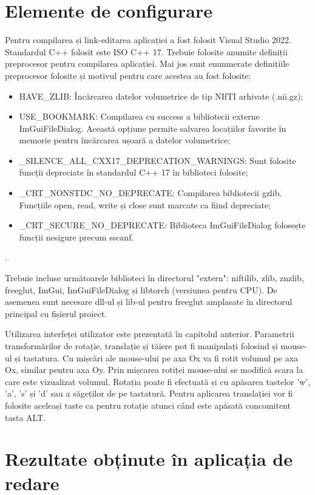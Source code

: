 
\section{Elemente de configurare}

Pentru compilarea și link-editarea aplicației a fost folosit Visual Studio 2022. Standardul C++ folosit este ISO C++ 17. Trebuie folosite anumite definiții preprocesor pentru compilarea aplicației. Mai jos sunt enunmerate definițiile preprocesor folosite și motivul pentru care acestea au fost folosite:

\begin{itemize}
\item HAVE\_ZLIB: Încărcarea datelor volumetrice de tip NIfTI arhivate (.nii.gz);
\item USE\_BOOKMARK: Compilarea cu success a bibliotecii externe ImGuiFileDialog. Această opțiune permite salvarea locațiilor favorite în memorie pentru încărcarea ușoară a datelor volumetrice;
\item \_SILENCE\_ALL\_CXX17\_DEPRECATION\_WARNINGS: Sunt folosite funcții depreciate în standardul C++ 17 în biblioteci folosite;
\item \_CRT\_NONSTDC\_NO\_DEPRECATE: Compilarea bibliotecii gzlib. Funcțiile open, read, write și close sunt marcate ca fiind depreciate;
\item \_CRT\_SECURE\_NO\_DEPRECATE: Biblioteca ImGuiFileDialog folosește funcții nesigure precum sscanf.
\end{itemize}.

Trebuie incluse următoarele biblioteci în directorul "extern": niftilib, zlib, znzlib, freeglut, ImGui, ImGuiFileDialog și libtorch (versiunea pentru CPU). De asemenea sunt necesare dll-ul și lib-ul pentru freeglut amplasate în directorul principal cu fișierul proiect.

Utilizarea interfeței utilizator este prezentată în capitolul anterior. Parametrii transformărilor de rotație, translație și tăiere pot fi manipulați folosind și mouse-ul și tastatura. Cu mișcări ale mouse-ului pe axa Ox va fi rotit volumul pe axa Ox, similar pentru axa Oy. Prin mișcarea rotiței mouse-ului se modifică scara la care este vizualizat volumul. Rotația poate fi efectuată și cu apăsarea tastelor 'w', 'a', 's' și 'd' sau a săgeților de pe tastatură. Pentru aplicarea translației vor fi folosite aceleași taste ca pentru rotație atunci când este apăsată concomitent tasta ALT.


\section{Rezultate obținute în aplicația de redare}

